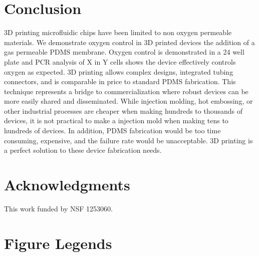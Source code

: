 
\section*{Conclusion}
3D printing microfluidic chips have been limited to non oxygen permeable materials.
We demonstrate oxygen control in 3D printed devices the addition of a gas permeable PDMS membrane. 
Oxygen control is demonstrated in a 24 well plate and PCR analysis of X in Y cells shows the device effectively controls oxygen as expected.
3D printing allows complex designs, integrated tubing connectors, and is comparable in price to standard PDMS fabrication.
This technique represents a bridge to commercialization where robust devices can be more easily shared and disseminated.
While injection molding, hot embossing, or other industrial processes are cheaper when making hundreds to thousands of devices, it is not practical to make a injection mold when making tens to hundreds of devices.
In addition, PDMS fabrication would be too time consuming, expensive, and the failure rate would be unacceptable.
3D printing is a perfect solution to these device fabrication needs.



\section*{Acknowledgments}

This work funded by NSF 1253060.





%
%
% 

\section*{Figure Legends}
%

